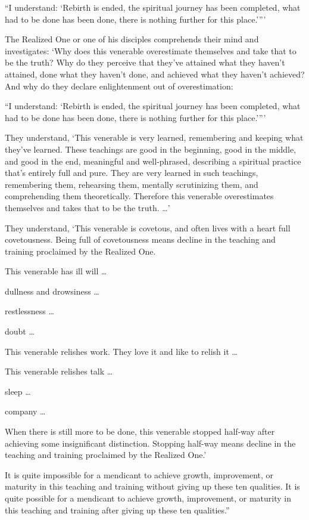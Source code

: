 \documentclass[12pt,openany]{book}%
\begin{document}
“I understand: ‘Rebirth is ended, the spiritual journey has been completed, what had to be done has been done, there is nothing further for this place.’”’ 

The Realized One or one of his disciples comprehends their mind and investigates: ‘Why does this venerable overestimate themselves and take that to be the truth? Why do they perceive that they’ve attained what they haven’t attained, done what they haven’t done, and achieved what they haven’t achieved? And why do they declare enlightenment out of overestimation: 

“I understand: ‘Rebirth is ended, the spiritual journey has been completed, what had to be done has been done, there is nothing further for this place.’”’ 

They understand, ‘This venerable is very learned, remembering and keeping what they’ve learned. These teachings are good in the beginning, good in the middle, and good in the end, meaningful and well-phrased, describing a spiritual practice that’s entirely full and pure. They are very learned in such teachings, remembering them, rehearsing them, mentally scrutinizing them, and comprehending them theoretically. Therefore this venerable overestimates themselves and takes that to be the truth. …’ 

They understand, ‘This venerable is covetous, and often lives with a heart full covetousness. Being full of covetousness means decline in the teaching and training proclaimed by the Realized One. 

This venerable has ill will … 

dullness and drowsiness … 

restlessness … 

doubt … 

This venerable relishes work. They love it and like to relish it … 

This venerable relishes talk … 

sleep … 

company … 

When there is still more to be done, this venerable stopped half-way after achieving some insignificant distinction. Stopping half-way means decline in the teaching and training proclaimed by the Realized One.’ 

It is quite impossible for a mendicant to achieve growth, improvement, or maturity in this teaching and training without giving up these ten qualities. It is quite possible for a mendicant to achieve growth, improvement, or maturity in this teaching and training after giving up these ten qualities.” 
\end{document}
